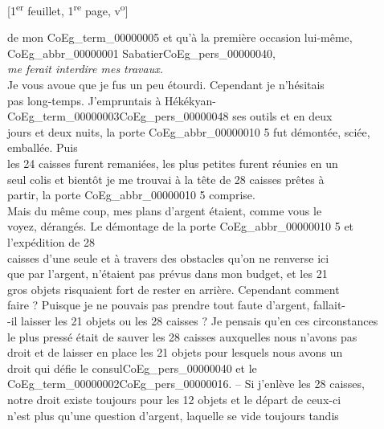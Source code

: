 \documentclass{book}
\begin{document}
{\footnotesize\begin{center} {[1\textsuperscript{er} feuillet, 1\textsuperscript{re} page, v\textsuperscript{o}]}\end{center}}
\noindent de mon \gls{CoEg_term_00000005} et qu’à la première occasion lui-même, \gls{CoEg_abbr_00000001} Sabatier\gls{CoEg_pers_00000040},\\
\textit{me ferait interdire mes travaux.}\\
\indent Je vous avoue que je fus un peu étourdi. Cependant je n’hésitais\\
pas long-temps. J’empruntais à Hékékyan-\gls{CoEg_term_00000003}\gls{CoEg_pers_00000048} ses outils et en deux\\
jours et deux nuits, la porte \gls{CoEg_abbr_00000010} 5 fut démontée, sciée, emballée. Puis\\
les 24 caisses furent remaniées, les plus petites furent réunies en un\\
seul colis et bientôt je me trouvai à la tête de 28 caisses prêtes à\\
partir, la porte \gls{CoEg_abbr_00000010} 5 comprise.\\
\indent Mais du même coup, mes plans d’argent étaient, comme vous le\\
voyez, dérangés. Le démontage de la porte \gls{CoEg_abbr_00000010} 5 et l’expédition de 28\\
caisses d’une seule et à travers des obstacles qu’on ne renverse ici\\
que par l’argent, n’étaient pas prévus dans mon budget, et les 21\\
gros objets risquaient fort de rester en arrière. Cependant comment\\
faire ? Puisque je ne pouvais pas prendre tout faute d’argent, fallait-\\
-il laisser les 21 objets ou les 28 caisses ? Je pensais qu’en ces circonstances\\
le plus pressé était de sauver les 28 caisses auxquelles nous n’avons pas\\
droit et de laisser en place les 21 objets pour lesquels nous avons un\\
droit qui défie le consul\gls{CoEg_pers_00000040} et le \Gls{CoEg_term_00000002}\gls{CoEg_pers_00000016}. – Si j’enlève les 28 caisses,\\
notre droit existe toujours pour les 12 objets et le départ de ceux-ci\\
n’est plus qu’une question d’argent, laquelle se vide toujours tandis\\
\end{document}
